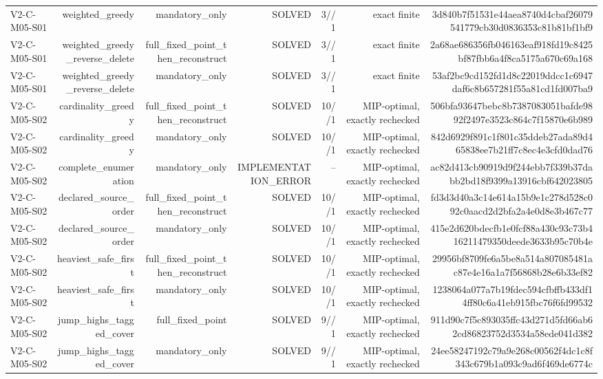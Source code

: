 {\begin{longtable}{lrrrrrr}
V2-C-M05-S01 & weighted\_greedy & mandatory\_only & SOLVED & 3//1 & exact finite & 3d840b7f51531e44aea8740d4cbaf26079541779cb30d0836353c81b81bf1bf9 \\
V2-C-M05-S01 & weighted\_greedy\_reverse\_delete & full\_fixed\_point\_then\_reconstruct & SOLVED & 3//1 & exact finite & 2a68ae686356fb046163eaf918fd19c8425bf87fbb6a4f8ca5175a670c69a168 \\
V2-C-M05-S01 & weighted\_greedy\_reverse\_delete & mandatory\_only & SOLVED & 3//1 & exact finite & 53af2bc9cd152fd1d8c22019ddcc1c6947daf6c8b657281f55a81cd1fd007ba9 \\
V2-C-M05-S02 & cardinality\_greedy & full\_fixed\_point\_then\_reconstruct & SOLVED & 10//1 & MIP-optimal, exactly rechecked & 506bfa93647bebc8b7387083051bafde9892f2497e3523c864c7f15870e6b989 \\
V2-C-M05-S02 & cardinality\_greedy & mandatory\_only & SOLVED & 10//1 & MIP-optimal, exactly rechecked & 842d6929f891c1f801c35ddeb27ada89d465838ee7b21ff7c8ec4e3cfd0dad76 \\
V2-C-M05-S02 & complete\_enumeration & mandatory\_only & IMPLEMENTATION\_ERROR & -- & MIP-optimal, exactly rechecked & ac82d413cb90919d9f244ebb7f339b37dabb2bd18f9399a13916cbf642023805 \\
V2-C-M05-S02 & declared\_source\_order & full\_fixed\_point\_then\_reconstruct & SOLVED & 10//1 & MIP-optimal, exactly rechecked & fd3d3d40a3c14e614a15b9e1c278d528c092c0aacd2d2bfa2a4e0d8e3b467c77 \\
V2-C-M05-S02 & declared\_source\_order & mandatory\_only & SOLVED & 10//1 & MIP-optimal, exactly rechecked & 415e2d620bdecfb1e0fcf88a430c93c73b416211479350deede3633b95c70b4e \\
V2-C-M05-S02 & heaviest\_safe\_first & full\_fixed\_point\_then\_reconstruct & SOLVED & 10//1 & MIP-optimal, exactly rechecked & 29956bf8709fe6a5be8a514a807085481ac87e4e16a1a7f56868b28e6b33ef82 \\
V2-C-M05-S02 & heaviest\_safe\_first & mandatory\_only & SOLVED & 10//1 & MIP-optimal, exactly rechecked & 1238064a077a7b19fdec594cfbffb433df14ff80c6a41eb915fbc76f6fd99532 \\
V2-C-M05-S02 & jump\_highs\_tagged\_cover & full\_fixed\_point & SOLVED & 9//1 & MIP-optimal, exactly rechecked & 911d90c7f5c893035ffc43d271d5fd66ab62cd86823752d3534a58ede041d382 \\
V2-C-M05-S02 & jump\_highs\_tagged\_cover & mandatory\_only & SOLVED & 9//1 & MIP-optimal, exactly rechecked & 24ee58247192c79a9e268c00562f4dc1c8f343c679b1a093c9ad6f469de6774c \\

\end{longtable}}
